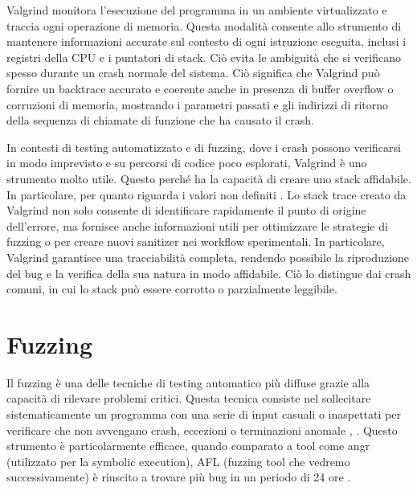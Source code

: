 Valgrind monitora l'esecuzione del programma in un ambiente virtualizzato e traccia ogni operazione di memoria. Questa modalità consente allo strumento di mantenere informazioni accurate sul contesto di ogni istruzione eseguita, inclusi i registri della CPU e i puntatori di stack. Ciò evita le ambiguità che si verificano spesso durante un crash normale del sistema. Ciò significa che Valgrind può fornire un backtrace accurato e coerente anche in presenza di buffer overflow o corruzioni di memoria, mostrando i parametri passati e gli indirizzi di ritorno della sequenza di chiamate di funzione che ha causato il crash.

In contesti di testing automatizzato e di fuzzing, dove i crash possono verificarsi in modo imprevisto e su percorsi di codice poco esplorati, Valgrind è uno strumento molto utile. Questo perché ha la capacità di creare uno stack affidabile. In particolare, per quanto riguarda i valori non definiti \cite{ref10}. Lo stack trace creato da Valgrind non solo consente di identificare rapidamente il punto di origine dell'errore, ma fornisce anche informazioni utili per ottimizzare le strategie di fuzzing o per creare nuovi sanitizer nei workflow sperimentali. In particolare, Valgrind garantisce una tracciabilità completa, rendendo possibile la riproduzione del bug e la verifica della sua natura in modo affidabile. Ciò lo distingue dai crash comuni, in cui lo stack può essere corrotto o parzialmente leggibile.

\section{Fuzzing}

Il fuzzing è una delle tecniche di testing automatico più diffuse grazie alla capacità di rilevare problemi critici. Questa tecnica consiste nel sollecitare sistematicamente un programma con una serie di input casuali o inaspettati per verificare che non avvengano crash, eccezioni o terminazioni anomale \cite{ref17}, \cite{ref20}.  Questo strumento è particolarmente efficace, quando comparato a tool come angr (utilizzato per la symbolic execution), AFL (fuzzing tool che vedremo successivamente) è riuscito a trovare più bug in un periodo di 24 ore \cite{ref29}.

